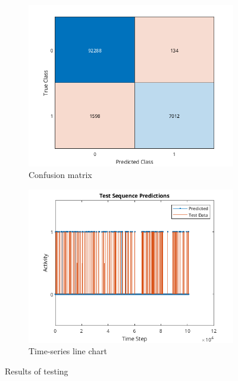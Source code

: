 \documentclass[12pt,a4paper,titlepage,openany]{report}
\begin{document}
     \begin{figure}[h]
          \begin{subfigure}{0.5\textwidth}
          \includegraphics[scale=0.5]{./new_training/training_test_data_confusion_chart_new.png}
          \caption{Confusion matrix}
          \end{subfigure}
          \begin{subfigure}{0.5\textwidth}
          \includegraphics[scale=0.5]{./new_training/test_sequence_predictions_new.png}
          \caption{Time-series line chart}
          \end{subfigure}
     \caption{Results of testing}
     \end{figure}
\end{document}
